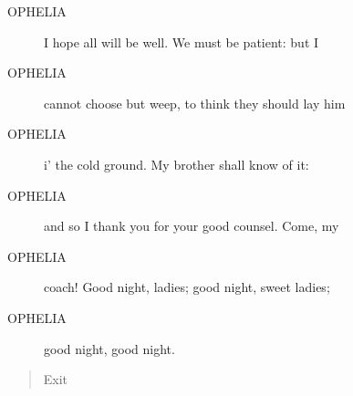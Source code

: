 \documentclass{article}
\begin{document}
\begin{description}
            
\item[OPHELIA] I hope all will be well. We must be patient: but I
\item[OPHELIA] cannot choose but weep, to think they should lay him
\item[OPHELIA] i' the cold ground. My brother shall know of it:
\item[OPHELIA] and so I thank you for your good counsel. Come, my
\item[OPHELIA] coach! Good night, ladies; good night, sweet ladies;
\item[OPHELIA] good night, good night.
\end{description}
          
\begin{quote}
Exit
\end{quote}
          
\end{document}
